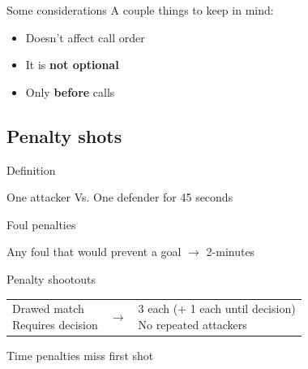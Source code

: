 \documentclass{beamer}
\begin{document}
    \begin{frame}{Some considerations}
        A couple things to keep in mind:
        \begin{itemize}
            \item Doesn't affect call order \pause
            \item It is \textbf{not optional} \pause
            \item Only \textbf{before} calls
        \end{itemize}
    \end{frame}

    \subsection{Penalty shots}

    \begin{frame}{Definition}
        \begin{center}
            One attacker Vs. One defender for 45 seconds
        \end{center}
    \end{frame}

    \begin{frame}{Foul penalties}
        \begin{center}
            Any foul that would prevent a goal \pause $\rightarrow$ 2-minutes
        \end{center}
    \end{frame}

    \begin{frame}{Penalty shootouts}
        \begin{tabular}{lcl}
            \parbox{0.4\textwidth}
            {
                Drawed match \\
                Requires decision
                \pause
            }
            &
            $\rightarrow$
            &
            \parbox{0.4\textwidth}
            {
                3 each (+ 1 each until decision) \\
                No repeated attackers
            }
        \end{tabular}

        \pause

        \begin{center}
            Time penalties miss first shot
        \end{center}
    \end{frame}
\end{document}

